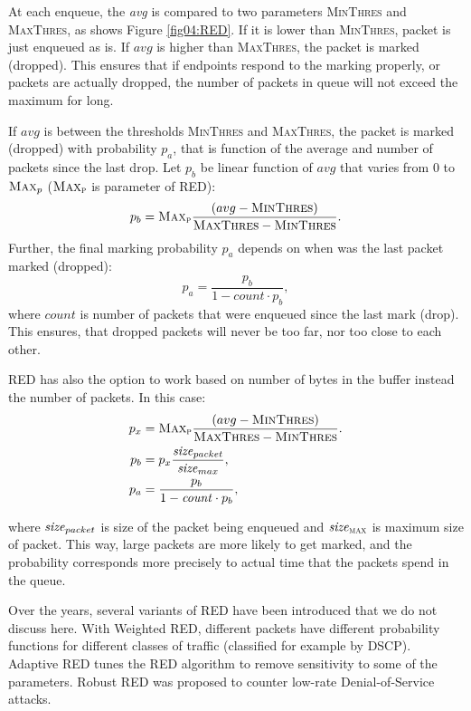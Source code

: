 At each enqueue, the \emph{avg} is compared to two parameters \textsc{MinThres} and \textsc{MaxThres}, as shows Figure \ref{fig04:RED}. If it is lower than \textsc{MinThres}, packet is just enqueued as is. If $avg$ is higher than \textsc{MaxThres}, the packet is marked (dropped). This ensures that if endpoints respond to the marking properly, or packets are actually dropped, the number of packets in queue will not exceed the maximum for long.

If $avg$ is between the thresholds \textsc{MinThres} and \textsc{MaxThres}, the packet is marked (dropped) with probability $p_a$, that is function of the average and number of packets since the last drop. Let $p_b$ be linear function of $avg$ that varies from 0 to $\textsc{Max}_p$ ($\textsc{Max}_\textsc{p}$ is parameter of RED):
\[
  p_b = \textsc{Max}_\textsc{p} \frac{(avg - \textsc{MinThres})}{\textsc{MaxThres} - \textsc{MinThres}}.
\]
Further, the final marking probability $p_a$ depends on when was the last packet marked (dropped):
\[
p_a = \frac{p_b}{1-count \cdot p_b},
\]
where $count$ is number of packets that were enqueued since the last mark (drop). This ensures, that dropped packets will never be too far, nor too close to each other\cite[Section 7]{Floyd:1993:RED:169931.169935}.

RED has also the option to work based on number of bytes in the buffer instead the number of packets. In this case:
\begin{align*}
p_x &= \textsc{Max}_\textsc{p} \frac{(avg - \textsc{MinThres})}{\textsc{MaxThres} - \textsc{MinThres}}.\\
p_b &= p_x \frac{\text{\emph{size}}_{packet}}{\text{\emph{size}}_{max}},\\
p_a &= \frac{p_b}{1-\text{\emph{count}} \cdot p_b},
\end{align*}

where $\text{\emph{size}}_{packet}$ is size of the packet being enqueued and $\text{\emph{size}}_{\textsc{max}}$ is maximum size of packet. This way, large packets are more likely to get marked, and the probability corresponds more precisely to actual time that the packets spend in the queue.

Over the years, several variants of RED have been introduced that we do not discuss here. With Weighted RED, different packets have different probability functions for different classes of traffic (classified for example by DSCP). Adaptive RED \cite{Floyd01adaptivered:} tunes the RED algorithm to remove sensitivity to some of the parameters. Robust RED \cite{RRED} was proposed to counter low-rate Denial-of-Service attacks.


